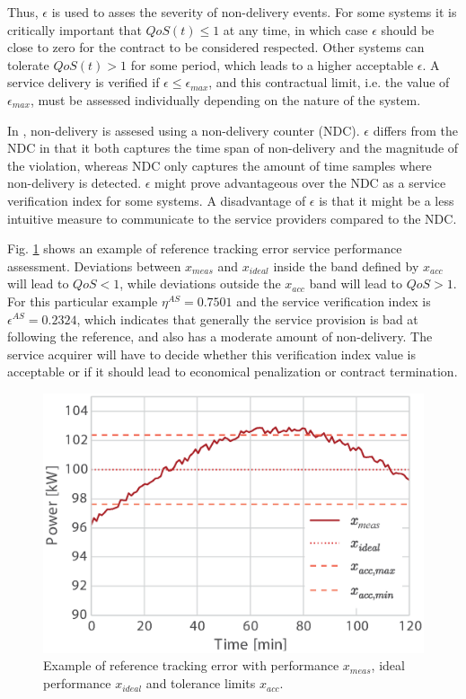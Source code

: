 
Thus, $\epsilon$ is used to asses the severity of non-delivery events. For some systems it is critically important that $QoS(t)\leq1$ at any time, in which case $\epsilon$ should be close to zero for the contract to be considered respected. Other systems can tolerate $QoS(t)>1$ for some period, which leads to a higher acceptable $\epsilon$. A service delivery is verified if $\epsilon \leq \epsilon_{max}$, and this contractual limit, i.e. the value of $\epsilon_{max}$, must be assessed individually depending on the nature of the system. %

In \cite{bondy2014performance}, non-delivery is assesed using a non-delivery counter (NDC). $\epsilon$ differs from the NDC in that it both captures the time span of non-delivery and the magnitude of the violation, whereas NDC only captures the amount of time samples where non-delivery is detected. $\epsilon$ might prove advantageous over the NDC as a service verification index for some systems. A disadvantage of $\epsilon$ is that it might be a less intuitive measure to communicate to the service providers compared to the NDC.

Fig. \ref{fig:RefErr} shows an example of reference tracking error service performance assessment. Deviations between $x_{meas}$ and $x_{ideal}$ inside the band defined by $x_{acc}$ will lead to $QoS<1$, while deviations outside the $x_{acc}$ band will lead to $QoS>1$. For this particular example $\eta^{AS}=0.7501$ and the service verification index is $\epsilon^{AS}=0.2324$, which indicates that generally the service provision is bad at following the reference, and also has a moderate amount of non-delivery. The service acquirer will have to decide whether this verification index value is acceptable or if it should lead to economical penalization or contract termination.

\begin{figure}
\centering
\includegraphics[width=\columnwidth]{graphics/tsg/reftrack2.eps}
\caption{Example of reference tracking error with performance $x_{meas}$, ideal performance $x_{ideal}$ and tolerance limits $x_{acc}$.}
\label{fig:RefErr}
\end{figure}
